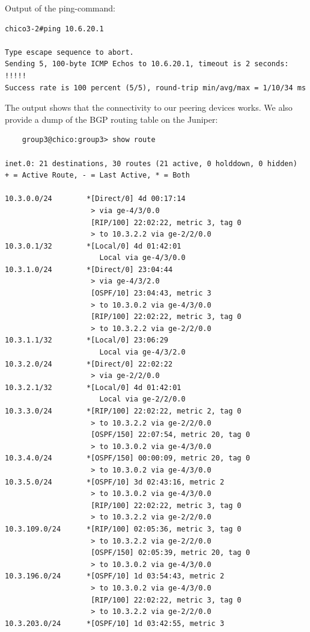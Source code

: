\documentclass[10pt,a4paper]{article}
\begin{document}
Output of the ping-command:
\begin{verbatim}
chico3-2#ping 10.6.20.1

Type escape sequence to abort.
Sending 5, 100-byte ICMP Echos to 10.6.20.1, timeout is 2 seconds:
!!!!!
Success rate is 100 percent (5/5), round-trip min/avg/max = 1/10/34 ms
\end{verbatim}

The output shows that the connectivity to our peering devices works. We also provide a dump of the BGP routing table on the Juniper:
\begin{verbatim}
    group3@chico:group3> show route 

inet.0: 21 destinations, 30 routes (21 active, 0 holddown, 0 hidden)
+ = Active Route, - = Last Active, * = Both

10.3.0.0/24        *[Direct/0] 4d 00:17:14
                    > via ge-4/3/0.0
                    [RIP/100] 22:02:22, metric 3, tag 0
                    > to 10.3.2.2 via ge-2/2/0.0
10.3.0.1/32        *[Local/0] 4d 01:42:01
                      Local via ge-4/3/0.0
10.3.1.0/24        *[Direct/0] 23:04:44
                    > via ge-4/3/2.0
                    [OSPF/10] 23:04:43, metric 3
                    > to 10.3.0.2 via ge-4/3/0.0
                    [RIP/100] 22:02:22, metric 3, tag 0
                    > to 10.3.2.2 via ge-2/2/0.0
10.3.1.1/32        *[Local/0] 23:06:29
                      Local via ge-4/3/2.0
10.3.2.0/24        *[Direct/0] 22:02:22
                    > via ge-2/2/0.0
10.3.2.1/32        *[Local/0] 4d 01:42:01
                      Local via ge-2/2/0.0
10.3.3.0/24        *[RIP/100] 22:02:22, metric 2, tag 0
                    > to 10.3.2.2 via ge-2/2/0.0
                    [OSPF/150] 22:07:54, metric 20, tag 0
                    > to 10.3.0.2 via ge-4/3/0.0
10.3.4.0/24        *[OSPF/150] 00:00:09, metric 20, tag 0
                    > to 10.3.0.2 via ge-4/3/0.0
10.3.5.0/24        *[OSPF/10] 3d 02:43:16, metric 2
                    > to 10.3.0.2 via ge-4/3/0.0
                    [RIP/100] 22:02:22, metric 3, tag 0
                    > to 10.3.2.2 via ge-2/2/0.0
10.3.109.0/24      *[RIP/100] 02:05:36, metric 3, tag 0
                    > to 10.3.2.2 via ge-2/2/0.0
                    [OSPF/150] 02:05:39, metric 20, tag 0
                    > to 10.3.0.2 via ge-4/3/0.0
10.3.196.0/24      *[OSPF/10] 1d 03:54:43, metric 2
                    > to 10.3.0.2 via ge-4/3/0.0
                    [RIP/100] 22:02:22, metric 3, tag 0
                    > to 10.3.2.2 via ge-2/2/0.0
10.3.203.0/24      *[OSPF/10] 1d 03:42:55, metric 3

\end{verbatim}
\end{document}
